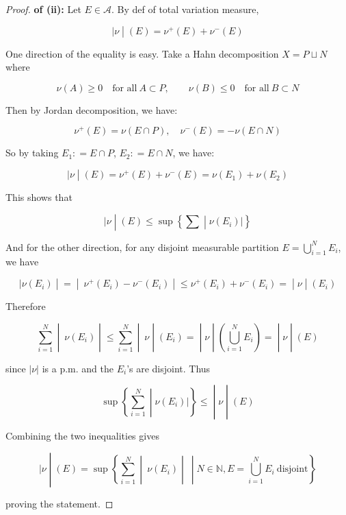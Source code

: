 \begin{proof}

\textbf{of (ii):} Let \(E \in \mathcal{A}\). By def of total variation measure,

\[\left. |\nu \middle| (E) = \nu^{+}(E) + \nu^{-}(E) \right.\]

One direction of the equality is easy. Take a Hahn decomposition \(X = P \sqcup N\) where

\[\nu(A) \geq 0\quad\text{for all}\ A \subset P,\qquad\nu(B) \leq 0\quad\text{for all}\ B \subset N\]

Then by Jordan decomposition, we have:

\[\nu^{+}(E) = \nu(E \cap P),\quad\nu^{-}(E) = - \nu(E \cap N)\]

So by taking \(E_{1}: = E \cap P\), \(E_{2}: = E \cap N\), we have:

\[\left. |\nu \middle| (E) = \nu^{+}(E) + \nu^{-}(E) = \nu(E_{1}) + \nu(E_{2}) \right.\]

This shows that

\[\left. |\nu \middle| (E) \leq \sup\left\{ \sum \middle| \nu(E_{i})| \right\} \right.\]

And for the other direction, for any disjoint measurable partition \(E = \bigcup_{i = 1}^{N}E_{i}\), we have

\[\left. |\nu(E_{i}) \middle| = \middle| \ \nu^{+}(E_{i}) - \nu^{-}(E_{i}) \middle| \leq \nu^{+}(E_{i}) + \nu^{-}(E_{i}) = \middle| \nu \middle| (E_{i}) \right.\]

Therefore

\[\left. \sum\limits_{i = 1}^{N} \middle| \ \nu(E_{i}) \middle| \leq \sum\limits_{i = 1}^{N} \middle| \ \nu \middle| (E_{i}) = \middle| \nu \middle| (\bigcup\limits_{i = 1}^{N}E_{i}) = \middle| \nu \middle| (E) \right.\]

since \(|\nu|\) is a p.m. and the \(E_{i}\)'s are disjoint. Thus

\[\left. \sup\left\{ \sum\limits_{i = 1}^{N} \middle| \nu(E_{i})| \right\} \leq \middle| \nu \middle| (E) \right.\]

Combining the two inequalities gives

\[\left. |\nu \middle| (E) = \sup\left\{ \sum\limits_{i = 1}^{N} \middle| \ \nu(E_{i}) \middle| \  \middle| N \in \mathbb{N},E = \bigcup\limits_{i = 1}^{N}E_{i}\ \text{disjoint} \right\} \right.\]

proving the statement.

\end{proof}

